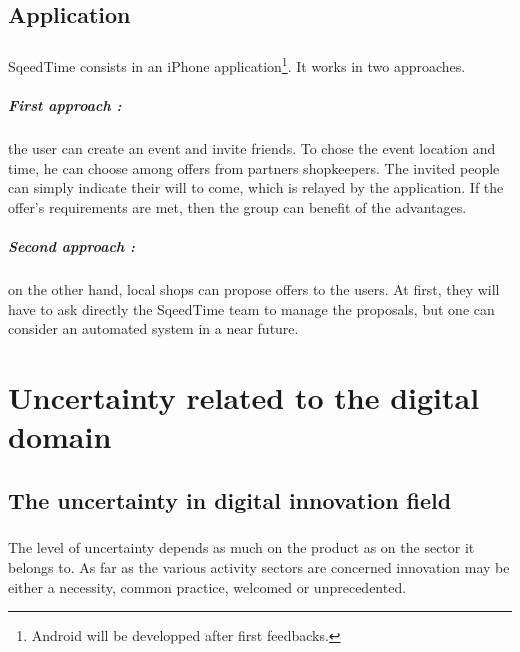 \documentclass[twoside]{report}
\begin{document}
	\section{Application}
	\paragraph{}
	SqeedTime consists in an iPhone application\footnote{Android will be developped after first feedbacks.}. It works in two approaches. 
	\paragraph{First approach :}the user can create an event and invite friends. To chose the event location and time, he can choose among offers from partners shopkeepers. The invited people can simply indicate their will to come, which is relayed by the application. If the offer's requirements are met, then the group can benefit of the advantages.
	\paragraph{Second approach :}on the other hand, local shops can propose offers to the users. At first, they will have to ask directly the SqeedTime team to manage the proposals, but one can consider an automated system in a near future.



	\chapter{Uncertainty related to the digital domain}
	\label{ch:kinds}
	\section{The uncertainty in digital innovation field}
	\paragraph{}
	The level of uncertainty depends as much on the product as on the sector it belongs to. As far as the various activity sectors are concerned innovation may be either a necessity, common practice, welcomed or unprecedented.
\end{document}
